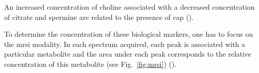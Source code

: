 \begin{enumerate}[leftmargin=*]
An increased concentration of choline associated with a decreased concentration of citrate and spermine are related to the presence of \ac{cap} (\cite{Awwad2012,Costello2006,Graaf2000,Giskeodegard2013}).




To determine the concentration of these biological markers, one has to focus on the \ac{mrsi} modality. %
In each spectrum acquired, each peak is associated with a particular metabolite and the area under each peak corresponds to the relative concentration of this metabolite (see Fig.~\ref{fig:mrsi}) (\cite{Parfait2010}).


\end{enumerate}
